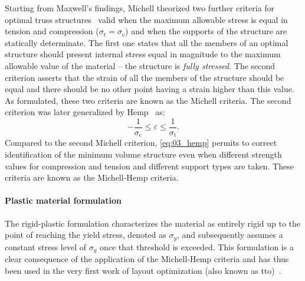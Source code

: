 Starting from Maxwell's findings, Michell theorized two further criteria for optimal truss structures~ valid when the maximum allowable stress is equal in tension and compression ($\sigma_\text{t} = \sigma_\text{c}$) and when the supports of the structure are statically determinate. The first one states that all the members of an optimal structure should present internal stress equal in magnitude to the maximum allowable value of the material -- \ie the structure is \textit{fully stressed}. The second criterion asserts that the strain of all the members of the structure should be equal and there should be no other point having a strain higher than this value. As formulated, these two criteria are known as the Michell criteria. The second criterion was later generalized by Hemp~ as:
\begin{equation} \label{eq:03_hemp}
    -\frac{1}{\sigma_\text{c}}\leq \varepsilon \leq \frac{1}{\sigma_\text{t}}.
\end{equation}
Compared to the second Michell criterion, \eqref{eq:03_hemp} permits to correct identification of the minimum volume structure even when different strength values for compression and tension and different support types are taken. These criteria are known as the Michell-Hemp criteria.

\paragraph{Plastic material formulation}
The rigid-plastic formulation characterizes the material as entirely rigid up to the point of reaching the yield stress, denoted as $\sigma_y$, and subsequently assumes a constant stress level of $\sigma_y$ once that threshold is exceeded. This formulation is a clear consequence of the application of the Michell-Hemp criteria and has thus been used in the very first work of layout optimization (also known as \gls{tto})~. 

